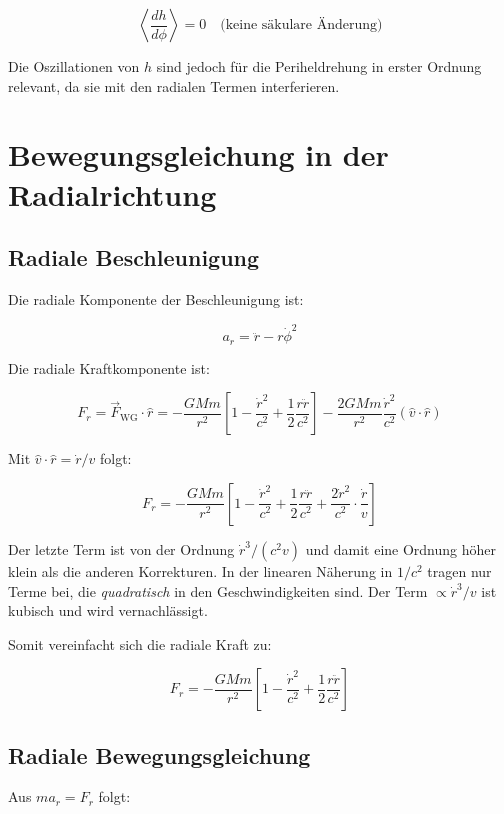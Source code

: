 \[
\left\langle \frac{dh}{d\phi} \right\rangle = 0 \quad \text{(keine säkulare Änderung)}
\]

Die Oszillationen von \( h \) sind jedoch für die Periheldrehung in erster 
Ordnung relevant, da sie mit den radialen Termen interferieren.

\section{Bewegungsgleichung in der Radialrichtung}
\label{app:periheldrehung_radial}

\subsection{Radiale Beschleunigung}
\label{sub:periheldrehung_beschleunigung}

Die radiale Komponente der Beschleunigung ist:

\[
a_r = \ddot{r} - r\dot{\phi}^2
\]

Die radiale Kraftkomponente ist:

\[
F_r = \vec{F}_{\text{WG}} \cdot \hat{r} = -\frac{GMm}{r^2} 
\left[ 1 - \frac{\dot{r}^2}{c^2} + \frac{1}{2} \frac{r\ddot{r}}{c^2} \right] 
-\frac{2GMm}{r^2} \frac{\dot{r}^2}{c^2} (\hat{v} \cdot \hat{r})
\]

Mit \( \hat{v} \cdot \hat{r} = \dot{r}/v \) folgt:

\[
F_r = -\frac{GMm}{r^2} \left[ 1 - \frac{\dot{r}^2}{c^2} + \frac{1}{2} \frac{r\ddot{r}}{c^2} 
+ \frac{2\dot{r}^2}{c^2} \cdot \frac{\dot{r}}{v} \right]
\]

Der letzte Term ist von der Ordnung \( \dot{r}^3/(c^2 v) \) und damit 
eine Ordnung höher klein als die anderen Korrekturen. In der linearen 
Näherung in \( 1/c^2 \) tragen nur Terme bei, die \emph{quadratisch} in 
den Geschwindigkeiten sind. Der Term \( \propto \dot{r}^3/v \) ist kubisch 
und wird vernachlässigt.

Somit vereinfacht sich die radiale Kraft zu:

\[
F_r = -\frac{GMm}{r^2} \left[ 1 - \frac{\dot{r}^2}{c^2} + \frac{1}{2} \frac{r\ddot{r}}{c^2} \right] \tag{H.2}
\]

\subsection{Radiale Bewegungsgleichung}
\label{sub:periheldrehung_radial_gleichung}

Aus \( m a_r = F_r \) folgt:


